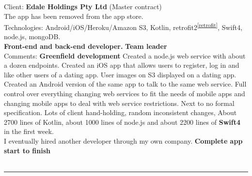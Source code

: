\documentclass{article}
\begin{document}
Client: 	\textbf  {Edale Holdings Pty Ltd } (Master contract) \\
The app has been removed from the app store. \\
Technologies: 	Android/iOS/Heroku/Amazon S3, Kotlin, retrofit2\textsuperscript{\ref{retrofit}}, Swift4, node.js, mongoDB. \\
\textbf{ 		Front-end and back-end developer. } {\bf Team leader}  \\
Comments:	{\bf Greenfield development} Created a node.js web service with about a dozen endpoints. Created an iOS app that allows users to register, log in and like other users of a dating app. User images on S3 displayed on a dating app. Created an Android version of the same app to talk to the same web service. Full control over everything changing web services to fit the needs of mobile apps and changing mobile apps to deal with web service restrictions. Next to no formal specification. Lots of client hand-holding, random inconsistent changes, About 2700 lines of Kotlin, about 1000 lines of node.js and about 2200 lines of {\bf Swift4} in the first week.\\ I eventually hired another developer through my own company.
\textbf{Complete app start to finish} \\
\\


\noindent\hfil\rule{0.5\textwidth}{.4pt}\hfil
\\

\end{document}

